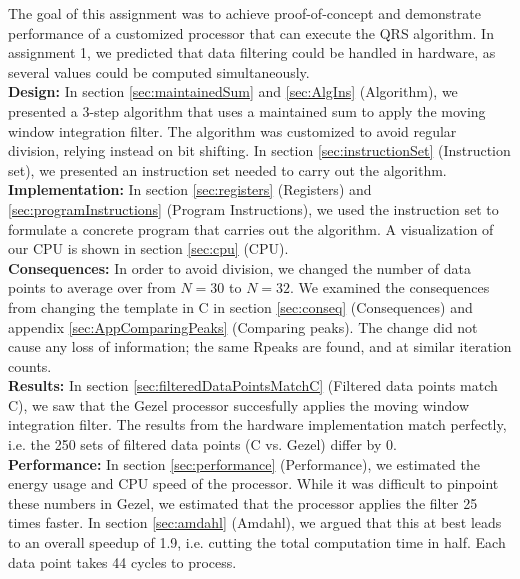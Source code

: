 The goal of this assignment was to achieve proof-of-concept and demonstrate performance of a customized processor that can execute the QRS algorithm. In assignment 1, we predicted that data filtering could be handled in hardware, as several values could be computed simultaneously. \\

\textbf{Design:} In section \ref{sec:maintainedSum} and \ref{sec:AlgIns} (Algorithm), we presented a 3-step algorithm that uses a maintained sum to apply the moving window integration filter. The algorithm was customized to avoid regular division, relying instead on bit shifting. In section \ref{sec:instructionSet} (Instruction set), we presented an instruction set needed to carry out the algorithm.\\

\textbf{Implementation:} In section \ref{sec:registers} (Registers) and \ref{sec:programInstructions} (Program Instructions), we used the instruction set to  formulate a concrete program that carries out the algorithm. A visualization of our CPU is shown in section \ref{sec:cpu} (CPU).\\

\textbf{Consequences:} In order to avoid division, we changed the number of data points to average over from $N=30$ to $N=32$. We examined the consequences from changing the template in C in section \ref{sec:conseq} (Consequences) and appendix \ref{sec:AppComparingPeaks} (Comparing peaks). The change did not cause any loss of information; the same Rpeaks are found, and at similar iteration counts.\\

\textbf{Results:} In section \ref{sec:filteredDataPointsMatchC} (Filtered data points match C), we saw that the Gezel processor succesfully applies the moving window integration filter. The results from the hardware implementation
match perfectly, i.e. the 250 sets of filtered data points (C vs. Gezel) differ by 0.\\

\textbf{Performance:} In section \ref{sec:performance} (Performance), we estimated the energy usage and CPU speed of the processor. While it was difficult to pinpoint these numbers in Gezel, we estimated that the processor applies the filter 25 times faster. In section \ref{sec:amdahl} (Amdahl), we argued that this at best leads to an overall speedup of 1.9, i.e. cutting the total computation time in half. Each data point takes 44 cycles to process.\\

